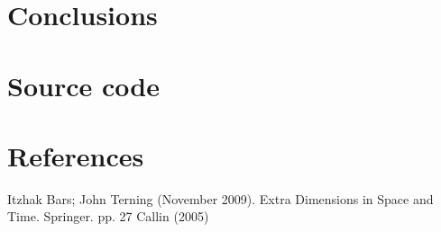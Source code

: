 \documentclass{aa}   %
\begin{document}
\section{Conclusions} \label{sec:conclusions}

\section{Source code}\label{sec:files}


\section{References}
Itzhak Bars; John Terning (November 2009). Extra Dimensions in Space and Time. Springer. pp. 27
Callin (2005)
\end{document}
